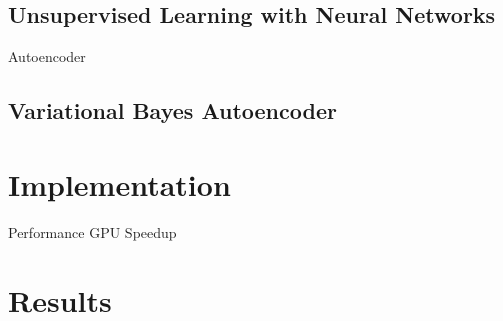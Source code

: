 \subsection{Unsupervised Learning with Neural Networks}
\label{subsec:autoencoder}
Autoencoder

\subsection{Variational Bayes Autoencoder}
\label{subsec:variational-bayes}

\section{Implementation}
\label{sec:ae-implementation}

Performance
GPU Speedup

\section{Results}
\label{sec:ae-results}


